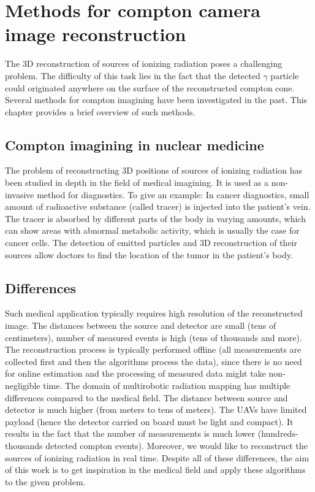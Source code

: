\chapter{Methods for compton camera image reconstruction}
The 3D reconstruction of sources of ionizing radiation poses a challenging problem.
The difficulty of this task lies in the fact that the detected $\gamma$ particle could originated anywhere on the surface of the reconstructed compton cone.
Several methods for compton imagining have been investigated in the past.
This chapter provides a brief overview of such methods.

\section{Compton imagining in nuclear medicine}
The problem of reconstructing 3D positions of sources of ionizing radiation has been studied in depth in the field of medical imagining.
It is used as a non-invasive method for diagnostics.
To give an example:
In cancer diagnostics, small amount of radioactive substance (called tracer) is injected into the patient's vein.
The tracer is absorbed by different parts of the body in varying amounts, which can show areas with abnormal metabolic activity, which is usually the case for cancer cells.
The detection of emitted particles and 3D reconstruction of their sources allow doctors to find the location of the tumor in the patient's body.

\section{Differences}
Such medical application typically requires high resolution of the reconstructed image.
The distances between the source and detector are small (tens of centimeters), number of measured events is high (tens of thousands and more).
The reconstruction process is typically performed offline (all measurements are collected first and then the algorithms process the data), since there is no need for online estimation and the processing of measured data might take non-negligible time.
The domain of multirobotic radiation mapping has multiple differences compared to the medical field.
The distance between source and detector is much higher (from meters to tens of meters).
The \ac{UAV}s have limited payload (hence the detector carried on board must be light and compact).
It results in the fact that the number of measurements is much lower (hundreds-thousands detected compton events).
Moreover, we would like to reconstruct the sources of ionizing radiation in real time.
Despite all of these differences, the aim of this work is to get inspiration in the medical field and apply these algorithms to the given problem.

